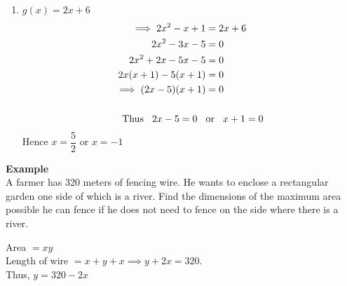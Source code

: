 \documentclass[11pt,a4paper]{article}
\begin{document}
\begin{enumerate}
\begin{enumerate}
\end{enumerate}
\item $g(x)=2x+6$
\begin{align*}
\implies 
2x^2-x+1 & = 2x+6\\
2x^2-3x-5 & =0\\
2x^2+2x-5x-5 & =0\\
2x(x+1)-5(x+1) & = 0\\
\implies (2x-5)(x+1) & = 0\\\\
\text{Thus}\hspace{0.3cm} 2x-5=0\hspace{0.3cm} &\text{or}\hspace{0.3cm} x+1=0\\
\end{align*}
Hence $x=\dfrac{5}{2}$ or $x=-1$\\
\end{enumerate}






\textbf{Example}\\
A farmer has 320 meters of fencing wire. He wants to enclose a rectangular garden one side of which is a river. Find the dimensions of the maximum area possible he can fence if he does not need to fence on the side where there is a river.


\begin{figure}[H]
\centering
{}
\end{figure}


Area $=xy$\\

Length of wire $=x+y+x\implies y+2x=320$.\\

Thus, $y=320-2x$
\end{document}

